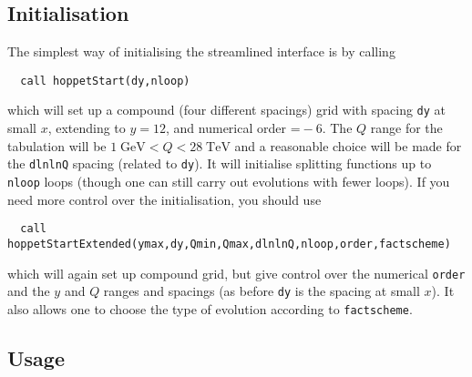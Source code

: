 \documentclass[12pt]{article}
\newcommand{\GeV}{\;\mathrm{GeV}}
\newcommand{\TeV}{\;\mathrm{TeV}}
\newcommand{\ttt}[1]{\texttt{#1}}
\begin{document}
\subsection{Initialisation}
\label{sec:vanilla_initialisation}

The simplest way of initialising the 
streamlined interface is by calling
\begin{lstlisting}
  call hoppetStart(dy,nloop)
\end{lstlisting}
which will set up a compound (four different spacings) grid with
spacing \ttt{dy} at small $x$, extending to $y = 12$, and numerical
order $\ttt=-6$.  The $Q$ range for the tabulation will be $1\GeV <
Q<28 \TeV$ and a reasonable choice will be made for the \ttt{dlnlnQ}
spacing (related to \ttt{dy}). It will initialise splitting functions
up to \ttt{nloop} loops (though one can still carry out evolutions
with fewer loops).
%
If you need more control over the initialisation, you should use
\begin{lstlisting}
  call hoppetStartExtended(ymax,dy,Qmin,Qmax,dlnlnQ,nloop,order,factscheme)
\end{lstlisting}
which will again set up compound grid, but give control over the
numerical \ttt{order} and the $y$ and $Q$ ranges and spacings (as
before \ttt{dy} is the spacing at small $x$). It also allows one to
choose the type of evolution according to \ttt{factscheme}.


\subsection{Usage}
\label{sec:vanilla_usage}
\end{document}
